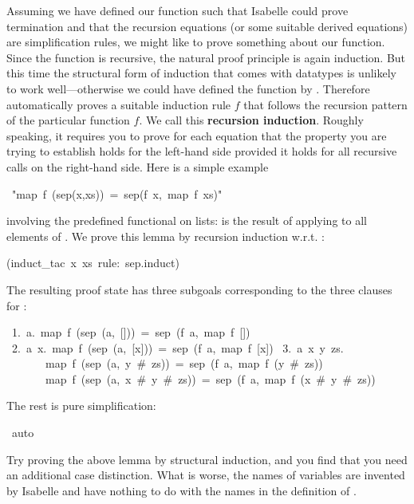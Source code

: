 \begin{isabelle}%
%
\begin{isamarkuptext}%
Assuming we have defined our function such that Isabelle could prove
termination and that the recursion equations (or some suitable derived
equations) are simplification rules, we might like to prove something about
our function. Since the function is recursive, the natural proof principle is
again induction. But this time the structural form of induction that comes
with datatypes is unlikely to work well---otherwise we could have defined the
function by . Therefore  automatically
proves a suitable induction rule $f$ that follows the
recursion pattern of the particular function $f$. We call this
\textbf{recursion induction}. Roughly speaking, it
requires you to prove for each  equation that the property
you are trying to establish holds for the left-hand side provided it holds
for all recursive calls on the right-hand side. Here is a simple example%
\end{isamarkuptext}%
\ {"}map\ f\ (sep(x,xs))\ =\ sep(f\ x,\ map\ f\ xs){"}%
\begin{isamarkuptxt}%
\noindent
involving the predefined  functional on lists: 
is the result of applying  to all elements of . We prove
this lemma by recursion induction w.r.t. :%
\end{isamarkuptxt}%
(induct\_tac\ x\ xs\ rule:\ sep.induct)%
\begin{isamarkuptxt}%
\noindent
The resulting proof state has three subgoals corresponding to the three
clauses for :
\begin{isabellepar}%
~1.~{\isasymAnd}a.~map~f~(sep~(a,~[]))~=~sep~(f~a,~map~f~[])\isanewline
~2.~{\isasymAnd}a~x.~map~f~(sep~(a,~[x]))~=~sep~(f~a,~map~f~[x])\isanewline
~3.~{\isasymAnd}a~x~y~zs.\isanewline
~~~~~~~map~f~(sep~(a,~y~\#~zs))~=~sep~(f~a,~map~f~(y~\#~zs))~{\isasymLongrightarrow}\isanewline
~~~~~~~map~f~(sep~(a,~x~\#~y~\#~zs))~=~sep~(f~a,~map~f~(x~\#~y~\#~zs))%
\end{isabellepar}%
The rest is pure simplification:%
\end{isamarkuptxt}%
\ auto%
\begin{isamarkuptext}%
Try proving the above lemma by structural induction, and you find that you
need an additional case distinction. What is worse, the names of variables
are invented by Isabelle and have nothing to do with the names in the
definition of .


\end{isamarkuptext}
\end{isabelle}
